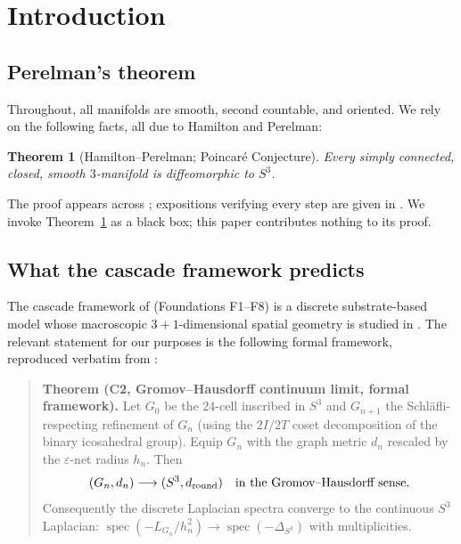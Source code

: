 \documentclass[11pt, a4paper]{amsart}
\newtheorem{theorem}{Theorem}[section]
\theoremstyle{definition}
\begin{document}
\tableofcontents

\section{Introduction}

\subsection{Perelman's theorem}

Throughout, all manifolds are smooth, second countable, and
oriented. We rely on the following facts, all due to Hamilton and
Perelman:

\begin{theorem}[Hamilton--Perelman; Poincar\'{e} Conjecture]
\label{thm:perelman}
Every simply connected, closed, smooth $3$-manifold is
diffeomorphic to $S^{3}$.
\end{theorem}

\noindent
The proof appears across \cite{Hamilton1982, Perelman1, Perelman2,
Perelman3}; expositions verifying every step are given in
\cite{KleinerLott, MorganTian, CaoZhu}. We invoke
Theorem~\ref{thm:perelman} as a black box; this paper contributes
nothing to its proof.

\subsection{What the cascade framework predicts}

The cascade framework of \cite{CascadeFoundations} (Foundations
F1--F8) is a discrete substrate-based model whose macroscopic
$3+1$-dimensional spatial geometry is studied in \cite{CascadeGR}.
The relevant statement for our purposes is the following formal
framework, reproduced verbatim from \cite[\S C2.bis.1]{CascadeGR}:

\begin{quote}
\textbf{Theorem (C2, Gromov--Hausdorff continuum limit, formal
framework).} Let $G_{0}$ be the $24$-cell inscribed in $S^{3}$ and
$G_{n+1}$ the Schl\"{a}fli-respecting refinement of $G_{n}$ (using
the $2I/2T$ coset decomposition of the binary icosahedral group).
Equip $G_{n}$ with the graph metric $d_{n}$ rescaled by the
$\varepsilon$-net radius $h_{n}$. Then
\[
  (G_{n}, d_{n}) \longrightarrow (S^{3}, d_{\rm round})
  \quad \text{in the Gromov--Hausdorff sense.}
\]
Consequently the discrete Laplacian spectra converge to the
continuous $S^{3}$ Laplacian:
$\operatorname{spec}(-L_{G_{n}}/h_{n}^{2}) \to
\operatorname{spec}(-\Delta_{S^{3}})$ with multiplicities.
\end{quote}
\end{document}
